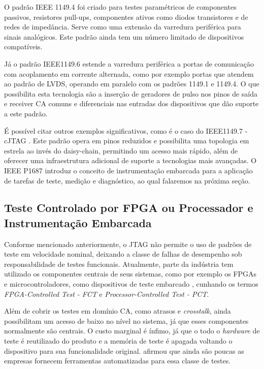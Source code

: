 O padrão IEEE 1149.4 \citep{ieee11494} foi criado para testes paramétricos de componentes passivos, resistores pull-ups, componentes ativos como diodos transistores e de redes de impedância. Serve como uma extensão da varredura periférica para sinais analógicos. Este padrão ainda tem um número limitado de dispositivos compatíveis.

Já o padrão IEEE1149.6 \citep{ieee11496} estende a varredura periférica a portas de comunicação com acoplamento em corrente alternada, como por exemplo portas que atendem ao padrão de LVDS, operando em paralelo com os padrões 1149.1 e 1149.4. O que possibilita esta tecnologia são a inserção de geradores de pulso nos pinos de saída e receiver CA comuns e diferenciais nas entradas dos dispositivos que dão suporte a este padrão.

É possível citar outros exemplos significativos, como é o caso do IEEE1149.7 - cJTAG \citep{ieee11497}. Este padrão opera em pinos reduzidos e possibilita uma topologia em estrela ao invés do daisy-chain, permitindo um acesso mais rápido, além de oferecer uma infraestrutura adicional de suporte a tecnologias mais avançadas. O IEEE P1687 \citep{ieee1687} introduz o conceito de instrumentação embarcada para a aplicação de tarefas de teste, medição e diagnóstico, ao qual falaremos na próxima seção.

\subsection{Teste Controlado por FPGA ou Processador e Instrumentação Embarcada}
\label{FCT}

Conforme mencionado anteriormente, o JTAG não permite o uso de padrões de teste em velocidade nominal, deixando a classe de falhas de desempenho sob responsabilidade de testes funcionais. Atualmente, parte da indústria tem utilizado os componentes centrais de seus sistemas, como por exemplo os FPGAs e microcontroladores, como dispositivos de teste embarcado \citep{alcrouch2011, thomaswenzel2013}, cunhando os termos \textit{FPGA-Controlled Test - FCT} e \textit{Processor-Controlled Test - PCT}. 

 Além de cobrir os testes em domínio CA, como atrasos e \textit{crosstalk}, ainda possibilitam um acesso de baixo no nível no sistema, já que esses componentes normalmente são centrais. O custo marginal é ínfimo, já que o todo o \textit{hardware} de teste é reutilizado do produto e a memória de teste é apagada voltando o dispositivo para sua funcionalidade original. \citet{jutman2014high} afirmou que ainda são poucas as empresas fornecem ferramentas automatizadas para essa classe de testes.

